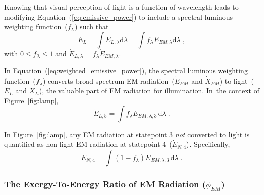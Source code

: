 \documentclass[energies,article,accept,moreauthors,pdftex]{Definitions/mdpi}\usepackage[]{graphicx}\usepackage[]{color}
\newcommand{\EM}{E \! M}
\begin{document}
Knowing that visual perception of light is a function of wavelength
leads to modifying Equation~(\ref{eq:emissive_power})
to include a spectral luminous weighting function~($f_\lambda$) such that
\begin{equation} \label{eq:weighted_emissive_power}
  \dot{E}_L = \int \dot{E}_{L,\lambda} \mathrm{d}\lambda = \int f_\lambda \dot{E}_{EM,\lambda} \mathrm{d}\lambda \; ,
\end{equation}
%
with $0 \le f_\lambda \le 1$
and $\dot{E}_{L,\lambda} = f_\lambda \dot{E}_{EM,\lambda}$.

In Equation~(\ref{eq:weighted_emissive_power}), 
the spectral luminous weighting function~($f_\lambda$) converts 
broad-spectrum EM radiation~($\dot{E}_{EM}$ and $\dot{X}_{EM}$)
to light~($\dot{E}_{L}$ and $\dot{X}_{L}$), 
the valuable part of EM radiation for illumination.
\mbox{In the} context of Figure~\ref{fig:lamp}, 
\begin{equation} \label{eq:L_dot_5}
  \dot{E}_{L,5} = \int f_\lambda \dot{E}_{EM,\lambda,3} \, \mathrm{d}\lambda \; .
\end{equation}

In Figure~\ref{fig:lamp}, any EM radiation at statepoint 3 
\emph{not} converted to light
is quantified as non-light EM radiation at statepoint 4~($\dot{E}_{N,4}$).
Specifically,
\begin{equation} \label{eq:N_dot_5}
  \dot{E}_{N,4} = \int (1 - f_\lambda) \dot{E}_{EM,\lambda,3} \, \mathrm{d}\lambda \; .
\end{equation}


\subsubsection{The Exergy-To-Energy Ratio of EM Radiation ($\phi_{\EM}$)}
\label{sec:phi_light}
\end{document}
